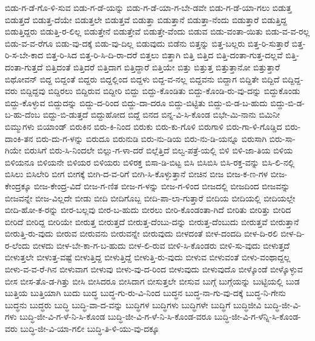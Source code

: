 {ಬಿಡು-ಗ-ಡೆ-ಗೊ-ಳಿ-ಸುವ
ಬಿಡು-ಗ-ಡೆ-ಯನ್ನು
ಬಿಡು-ಗ-ಡೆ-ಯಾ-ಗ-ಬೇ-ಡವೇ
ಬಿಡು-ಗ-ಡೆ-ಯಾ-ಗಲು
ಬಿಡುತ್ತ
ಬಿಡುತ್ತದೆ
ಬಿಡುತ್ತ-ದೆಯೇ
ಬಿಡುತ್ತಲೇ
ಬಿಡುತ್ತವೆ
ಬಿಡುತ್ತಾ
ಬಿಡುತ್ತಾನೆ
ಬಿಡುತ್ತಾ-ನೆಂದು
ಬಿಡುತ್ತಾರೆ
ಬಿಡುತ್ತಿದ್ದ
ಬಿಡುತ್ತಿದ್ದರು
ಬಿಡುತ್ತಿ-ರ-ಲಿಲ್ಲ
ಬಿಡುತ್ತೇನೆ
ಬಿಡುತ್ತೇವೆ
ಬಿಡುತ್ತೇ-ವೆಂದು
ಬಿಡುವ
ಬಿಡು-ವಂತಾ-ಯಿತು
ಬಿಡು-ವ-ವ-ರಲ್ಲ
ಬಿಡು-ವ-ವ-ರೆಗೂ
ಬಿಡು-ವು-ದಕ್ಕೆ
ಬಿಡು-ವು-ದಿಲ್ಲ
ಬಿಡುವುದು
ಬಿಡೆನು
ಬಿತ್ತನ್ನು
ಬಿತ್ತ-ಬಲ್ಲರು
ಬಿತ್ತ-ರಿ-ಸುತ್ತಾರೆ
ಬಿತ್ತ-ರಿ-ಸ-ಬೇ-ಕಾದ
ಬಿತ್ತ-ರಿ-ಸಿದ
ಬಿತ್ತ-ರಿ-ಸಿ-ದಿ-ರಾ-ದರೆ
ಬಿತ್ತಲು
ಬಿತ್ತಾಗಿ
ಬಿತ್ತಿ
ಬಿತ್ತಿದ
ಬಿತ್ತಿ-ದಂತಾ-ಗುತ್ತ-ದಲ್ಲವೆ
ಬಿತ್ತಿ-ದಂತಾ-ಗುತ್ತದೆ
ಬಿತ್ತಿದಂತೆ
ಬಿತ್ತಿದರೆ
ಬಿತ್ತಿದಾಗ
ಬಿತ್ತಿದ್ದಾರೆ
ಬಿತ್ತಿಯೇ
ಬಿತ್ತು
ಬಿತ್ತುತ್ತ
ಬಿತ್ತುತ್ತಾನೋ
ಬಿತ್ತುತ್ತಾರೆ
ಬಿಥೋವನ್
ಬಿದ್ದ
ಬಿದ್ದಂತೆ
ಬಿದ್ದರು
ಬಿದ್ದಲ್ಲಿಂದ
ಬಿದ್ದಳು
ಬಿದ್ದ-ವ-ನಲ್ಲ
ಬಿದ್ದವನು
ಬಿದ್ದಾಗ
ಬಿದ್ದಿತೇ
ಬಿದ್ದಿದೆ
ಬಿದ್ದಿದ್ದ-ವರು
ಬಿದ್ದಿದ್ದವು
ಬಿದ್ದಿರಲು
ಬಿದ್ದಿರುವ
ಬಿದ್ದೀರಿ
ಬಿದ್ದು
ಬಿದ್ದು-ಕೊಂಡಿತು
ಬಿದ್ದು-ಕೊಂಡಿ-ರು-ವು-ದನ್ನು
ಬಿದ್ದುಕೊಂಡು
ಬಿದ್ದು-ಕೊಳ್ಳುವ
ಬಿದ್ದುದನ್ನು
ಬಿದ್ದು-ದ-ರಿಂದ
ಬಿದ್ದು-ದಾ-ದರೂ
ಬಿದ್ದು-ಬಿಟ್ಟಿತು
ಬಿದ್ದು-ಬಿ-ಡ-ಬ-ಹುದು
ಬಿದ್ದು-ಬಿ-ಡ-ಬ-ಹು-ದೆಂಬ
ಬಿದ್ದು-ಬಿ-ಡುತ್ತದೆ
ಬಿದ್ದುಹೋದ
ಬಿದ್ದೆ
ಬಿನದ
ಬಿನ್ನ-ವಿ-ಸಿ-ಕೊಂಡ
ಬಿಭೇ-ಮಿ-ನಾನು
ಬಿಮಿನೀ
ಬಿಮ್ಮುಗಳು
ಬಿಯಾಂಡ್
ಬಿರುಕಿನ
ಬಿರು-ಕಿ-ನಿಂದ
ಬಿರುಕು
ಬಿರು-ಕು-ಗೊಳಿ
ಬಿರುಗಾಳಿ
ಬಿರು-ಗಾ-ಳಿ-ಗೊಡ್ಡಿದ
ಬಿರು-ದಾಂಕಿ-ತನ
ಬಿರು-ದು-ಗ-ಳನ್ನು
ಬಿರುದೂ
ಬಿರುನುಡಿ
ಬಿರು-ನು-ಡಿಯ
ಬಿರು-ನು-ಡಿ-ಯನ್ನೂ
ಬಿರುಸಾಗಿ
ಬಿರು-ಸಾ-ಗಿಯೇ
ಬಿರುಸಿಗೆ
ಬಿರು-ಸಿ-ನಿಂದಲೇ
ಬಿಲ್ಲು-ಗ-ಳಾ-ದರೆ
ಬಿಲ್ಲೆತ್ತಿದೆ
ಬಿಲ್ವ-ಪತ್ರೆ-ಯಲ್ಲಿ
ಬಿಳಿ
ಬಿಳಿ-ಜಾ-ತಿಯ
ಬಿಳಿಯ
ಬಿಳಿಯನೂ
ಬಿಳಿಯನೇ
ಬಿಳಿಯರ
ಬಿಳಿಯರು
ಬಿಳಿರಕ್ತ
ಬಿಸಾ-ಡಿ-ಬಿಟ್ಟ
ಬಿಸಿ
ಬಿಸಿಬಿಸಿ
ಬಿಸಿ-ರಕ್ತ-ವನ್ನು
ಬಿಸಿ-ಲಿ-ನಲ್ಲಿ
ಬಿಸಿಲು
ಬಿಸಿಲೇರಿ
ಬೀಗ
ಬೀಗಕ್ಕೆ
ಬೀಗಿ-ದ-ವ-ರಿಗೆ
ಬೀಗಿ-ಸಿ-ಕೊಳ್ಳುತ್ತಾನೆ
ಬೀಚಿನ
ಬೀಜ
ಬೀಜ-ಕ-ಣ-ಗಳ
ಬೀಜ-ಕೇಂದ್ರಕ್ಕೂ
ಬೀಜ-ಕೇಂದ್ರ-ವಿದೆ
ಬೀಜ-ಗ-ಣಿತ
ಬೀಜ-ಗ-ಳನ್ನು
ಬೀಜ-ಗ-ಳಿಂದ
ಬೀಜದಲ್ಲಿ
ಬೀಜದಿಂದ
ಬೀಜವನ್ನು
ಬೀಜವನ್ನೇ
ಬೀಜ-ವಿಲ್ಲದೇ
ಬೀಡು
ಬೀದಿ
ಬೀದಿಗೊಬ್ಬ
ಬೀದಿ-ಪಾ-ಲಾ-ಗುತ್ತಾರೆ
ಬೀದಿಯ
ಬೀದಿಯಲ್ಲಿ
ಬೀದಿಯಲ್ಲೇ
ಬೀದಿ-ಹೋ-ಕ-ರನ್ನು
ಬೀರ-ಬಲ್ಲವು
ಬೀರ-ಬ-ಹುದು
ಬೀರಲು
ಬೀರಿ-ಕೊಂಡಂತಾ-ಗಿದೆ
ಬೀರಿತು
ಬೀರಿತ್ತು
ಬೀರಿದ
ಬೀರಿದೆ
ಬೀರಿದ್ದ
ಬೀರಿಯೇ
ಬೀರುತ್ತ
ಬೀರುತ್ತದೆ
ಬೀರುತ್ತ-ದೆಂಬು-ದನ್ನು
ಬೀರುತ್ತ-ದೆಂಬುದು
ಬೀರುತ್ತವೆ
ಬೀರುತ್ತಾನೆ
ಬೀರುತ್ತಿ-ರು-ವುದು
ಬೀರುವ
ಬೀರುವನು
ಬೀರುವನ್ನೇ
ಬೀರುವುದು
ಬೀಳದಂತೆ
ಬೀಳ-ದಂದದಿ
ಬೀಳ-ದಿ-ರಲಿ
ಬೀಳ-ದಿ-ರ-ಲೆಂದು
ಬೀಳದು
ಬೀಳ-ಬೇ-ಕಾ-ಗ-ಬ-ಹುದು
ಬೀಳ-ಲಿ-ರುವ
ಬೀಳಿ-ಸಿ-ಕೊಂಡರು
ಬೀಳಿ-ಸು-ವುದು
ಬೀಳುತ್ತದೆ
ಬೀಳುತ್ತಲೇ
ಬೀಳುತ್ತ-ವಷ್ಟೆ
ಬೀಳುತ್ತಿದ್ದ
ಬೀಳುತ್ತಿದ್ದೆ
ಬೀಳುತ್ತಿ-ರು-ವುದು
ಬೀಳುವ
ಬೀಳುವಂತೆ
ಬೀಳು-ವಂಥಾದ್ದಲ್ಲ
ಬೀಳು-ವ-ವ-ರೆ-ಗಿನ
ಬೀಳುವಾಗ
ಬೀಳುವು
ಬೀಳು-ವು-ದ-ರಿಂದ
ಬೀಳುವುದು
ಬೀಳುವುದೊ
ಬೀಳ್ಕೊಂಡೆ
ಬೀಳ್ಕೊಳ್ಳುವ
ಬೀಸ
ಬೀಸ-ತೊ-ಡ-ಗಿತ್ತು
ಬೀಸಿ
ಬೀಸಿದರೂ
ಬೀಸಿದಾಗ
ಬೀಸುತ್ತಲೇ
ಬೀಸುವ
ಬುಗ್ಗೆ
ಬುಗ್ಗೆಯನ್ನು
ಬುಟ್ಟಿಯಲ್ಲಿ
ಬುಡ
ಬುತ್ತಿಯ
ಬುತ್ತಿಯಾಗಿ
ಬುದು
ಬುದ್ಧ
ಬುದ್ಧ-ಗು-ರು-ವಿ-ನಿಂದ
ಬುದ್ಧನ
ಬುದ್ಧ-ನಾ-ಗು-ವು-ದಕ್ಕೆ
ಬುದ್ಧ-ನಿ-ಗೇನು
ಬುದ್ಧನು
ಬುದ್ಧರು
ಬುದ್ಧಿ
ಬುದ್ಧಿ-ವಾ-ದ-ವನ್ನು
ಬುದ್ಧಿಗಳ
ಬುದ್ಧಿಗಳು
ಬುದ್ಧಿಗಳೇ
ಬುದ್ಧಿಗೆ
ಬುದ್ಧಿಜೀವಿ
ಬುದ್ಧಿ-ಜೀ-ವಿ-ಗಳು
ಬುದ್ಧಿ-ಜೀ-ವಿ-ಗ-ಳೆ-ನಿ-ಸಿ-ಕೊಂಡ
ಬುದ್ಧಿ-ಜೀ-ವಿ-ಗ-ಳೆ-ನಿ-ಸಿ-ಕೊಂಡ-ವರೂ
ಬುದ್ಧಿ-ಜೀ-ವಿ-ಗ-ಳೆನ್ನಿ-ಸಿ-ಕೊಂಡ-ವರು
ಬುದ್ಧಿ-ಜೀ-ವಿ-ಯಾ-ಗಲೀ
ಬುದ್ಧಿ-ತಿ-ಳಿ-ಯು-ವು-ದಕ್ಕೂ
}
